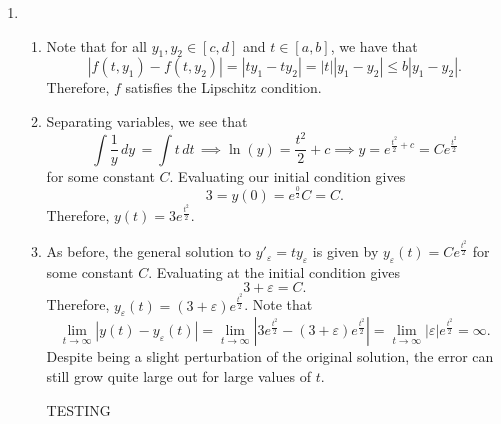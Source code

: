 \documentclass[12pt]{article}
\begin{document}
\begin{enumerate}[leftmargin=0em]
    \item
    \begin{enumerate}[leftmargin=!]
        \item 
        Note that for all $y_1,y_2\in [c,d]$ and $t\in [a,b]$, we have that
        \[|f(t,y_1)-f(t,y_2)| = |ty_{1}-ty_{2}| = |t||y_{1}-y_{2}|\leq b|y_{1}-y_{2}|.\]
        Therefore, $f$ satisfies the Lipschitz condition.

        \item
        Separating variables, we see that
        \[\int\frac{1}{y}\, dy\, = \int t\, dt\, \implies \ln(y) = \frac{t^2}{2}+c \implies y = e^{\frac{t^2}{2}+c} = Ce^{\frac{t^2}{2}}\]
        for some constant $C$. Evaluating our initial condition gives
        \[3=y(0) = e^{\frac{0}{2}}C=C.\]
        Therefore, $y(t) = 3e^{\frac{t^2}{2}}$.

        \item
        As before, the general solution to $y'_{\varepsilon} = ty_{\varepsilon}$ is given by $y_{\varepsilon}(t) = Ce^{\frac{t^2}{2}}$ for some constant $C$. Evaluating at the initial condition gives
        \[3+\varepsilon = C.\]
        Therefore, $y_{\varepsilon}(t) = (3+\varepsilon)e^{\frac{t^2}{2}}$. Note that
        \[\lim_{t \to \infty} |y(t)-y_{\varepsilon}(t)| = \lim_{t\to \infty} \left|3e^{\frac{t^2}{2}}-(3+\varepsilon)e^{\frac{t^2}{2}}\right| = \lim_{t\to \infty} \left|\varepsilon\right|e^{\frac{t^2}{2}}= \infty.\]
        Despite being a slight perturbation of the original solution, the error can still grow quite large out for large values of $t$. 

        TESTING
    \end{enumerate}
\end{enumerate}
\end{document}
